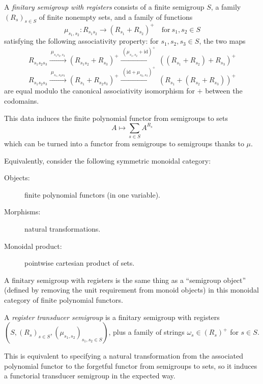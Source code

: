 \documentclass[a4paper,UKenglish,cleveref, autoref, thm-restate, numberwithinsect]{lipics-v2021}
\begin{document}
\begin{definition}
    A \emph{finitary semigroup with registers} consists of a finite semigroup $S$, a family $(R_s)_{s\in S}$ of finite nonempty sets, and a family of functions
    \[ \mu_{s_1, s_2} : R_{s_1 s_2} \to (R_{s_1} + R_{s_2})^+ \quad\text{for}\ s_1, s_2 \in S\]
    satisfying the following associativity property: for $s_1, s_2, s_3 \in S$, the two maps
    \[ R_{s_1 s_2 s_3} \xrightarrow{\;\mu_{s_1s_2,s_3}\;} (R_{s_1 s_2} + R_{s_3})^+ \xrightarrow{\;(\mu_{s_1,s_2}+\mathrm{id})^+\;} ((R_{s_1}+R_{s_2})+R_{s_3})^+ \]
    \[ R_{s_1 s_2 s_3} \xrightarrow{\;\mu_{s_1,s_2s_3}\;} (R_{s_1} + R_{s_2 s_3})^+ \xrightarrow{\;(\mathrm{id}+\mu_{s_2,s_3})^+\;} (R_{s_1}+(R_{s_2}+R_{s_3}))^+ \]
    are equal modulo the canonical associativity isomorphism for $+$ between the codomains.
    
    This data induces the finite polynomial functor from semigroups to sets
    \[ A \mapsto \sum_{s\in S} A^{R_s} \]
    which can be turned into a functor from semigroups to semigroups thanks to $\mu$.
\end{definition}

\begin{remark}
    Equivalently, consider the following symmetric monoidal category:
    \begin{description}
        \item[Objects:] finite polynomial functors (in one variable).
        \item[Morphisms:] natural transformations.
        \item[Monoidal product:] pointwise cartesian product of sets.
    \end{description}
    A finitary semigroup with registers is the same thing as a \enquote{semigroup object} (defined by removing the unit requirement from monoid objects) in this monoidal category of finite polynomial functors.
\end{remark}

\begin{definition}
    A \emph{register transducer semigroup} is a finitary semigroup with registers $(S, (R_s)_{s\in S},(\mu_{s_1,s_2})_{s_1,s_2\in S})$, plus a family of strings $\omega_s \in (R_s)^+$ for $s\in S$.
\end{definition}

This is equivalent to specifying a natural transformation from the associated polynomial functor to the forgetful functor from semigroups to sets, so it induces a functorial transducer semigroup in the expected way.
\end{document}
